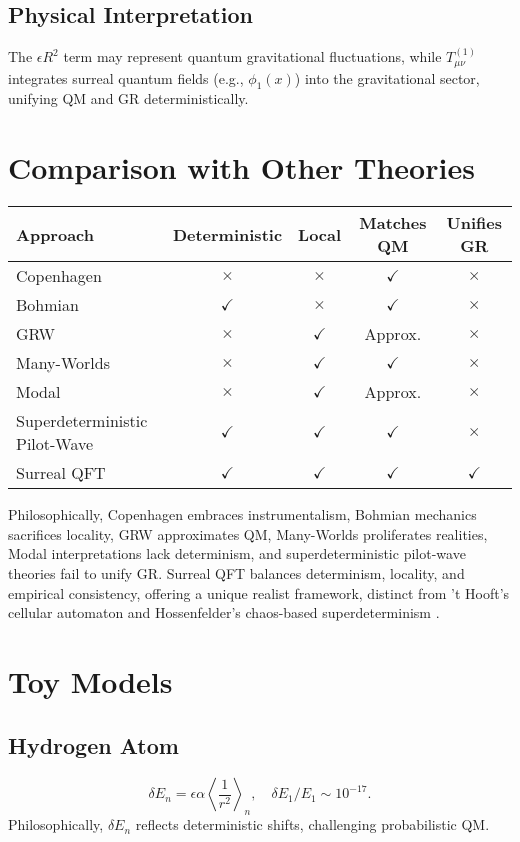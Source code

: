 \documentclass{article}
\begin{document}
\subsection{Physical Interpretation}
The \(\epsilon R^2\) term may represent quantum gravitational fluctuations, while \( T_{\mu\nu}^{(1)} \) integrates surreal quantum fields (e.g., \(\phi_1(x)\)) into the gravitational sector, unifying QM and GR deterministically.

\section{Comparison with Other Theories}
\begin{center}
\begin{tabular}{lcccc}
\hline
\textbf{Approach} & \textbf{Deterministic} & \textbf{Local} & \textbf{Matches QM} & \textbf{Unifies GR} \\
\hline
Copenhagen & $\times$ & $\times$ & $\checkmark$ & $\times$ \\
Bohmian & $\checkmark$ & $\times$ & $\checkmark$ & $\times$ \\
GRW & $\times$ & $\checkmark$ & Approx. & $\times$ \\
Many-Worlds & $\times$ & $\checkmark$ & $\checkmark$ & $\times$ \\
Modal & $\times$ & $\checkmark$ & Approx. & $\times$ \\
Superdeterministic Pilot-Wave & $\checkmark$ & $\checkmark$ & $\checkmark$ & $\times$ \\
Surreal QFT & $\checkmark$ & $\checkmark$ & $\checkmark$ & $\checkmark$ \\
\hline
\end{tabular}
\end{center}
Philosophically, Copenhagen embraces instrumentalism, Bohmian mechanics sacrifices locality, GRW approximates QM, Many-Worlds proliferates realities, Modal interpretations lack determinism, and superdeterministic pilot-wave theories fail to unify GR. Surreal QFT balances determinism, locality, and empirical consistency, offering a unique realist framework, distinct from 't Hooft's cellular automaton \cite{tHooft2014} and Hossenfelder's chaos-based superdeterminism \cite{Hossenfelder2020}.

\section{Toy Models}
\subsection{Hydrogen Atom}
\begin{equation}
\delta E_n = \epsilon \alpha \left\langle \frac{1}{r^2} \right\rangle_n, \quad \delta E_1 / E_1 \sim 10^{-17}.
\end{equation}
Philosophically, \(\delta E_n\) reflects deterministic shifts, challenging probabilistic QM.
\end{document}
